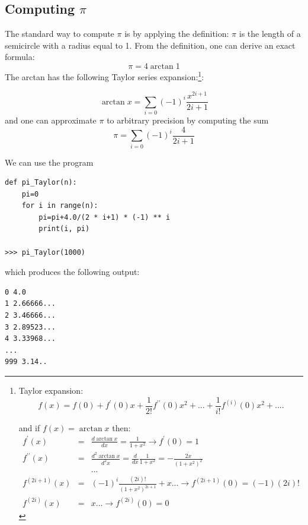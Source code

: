 \documentclass[justified, sixbynine]{tufte-book}
\theoremstyle{plain}%
\newtheorem * {corollary}{Corollary}
\theoremstyle{definition}
\theoremstyle{remark}
\newtheorem * {remark}{Remark}
\newtheorem * {note}{Note}
\begin{document}
\begin{fullwidth}
\goodbreak\subsection{Computing $\pi$}

The standard way to compute $\pi $ is by applying the definition: $\pi $ is
the length of a semicircle with a radius equal to 1. From the definition, one can
derive an exact formula:
\begin{equation}
\pi =4\arctan 1
\end{equation}
The arctan has the following Taylor series expansion:\footnote{%
Taylor expansion:
\begin{equation}
f(x)=f(0)+f^{\prime }(0)x+\frac 1{2!}f^{\prime \prime }(0)x^2+...+\frac
1{i!}f^{(i)}(0)x^2+....
\end{equation}
\par
and if $f(x)=\arctan x$ then:
\begin{eqnarray}
f^{\prime }(x) &=&\frac{d\arctan x}{dx}=\frac 1{1+x^2}\rightarrow f^{\prime
}(0)=1 \\
f^{\prime \prime }(x) &=&\frac{d^2\arctan x}{d^2x}=\frac d{dx}\frac
1{1+x^2}=-\frac{2x}{(1+x^2)^2} \\
&&... \\
f^{(2i+1)}(x) &=&(-1)^i\frac{(2i)!}{(1+x^2)^{2i+1}}+x...\rightarrow
f^{(2i+1)}(0)=(-1)(2i)! \\
f^{(2i)}(x) &=&x...\rightarrow f^{(2i)}(0)=0
\end{eqnarray}
}:

\begin{equation}
\arctan x=\allowbreak \sum_{i=0}(-1)^i\frac{x^{2i+1}}{2i+1}
\end{equation}
and one can approximate $\pi $ to arbitrary precision by computing the sum
\begin{equation}
\pi =\allowbreak \sum_{i=0}(-1)^i\frac 4{2i+1}
\end{equation}

We can use the program
\begin{lstlisting}
def pi_Taylor(n):
    pi=0
    for i in range(n):
        pi=pi+4.0/(2 * i+1) * (-1) ** i
        print(i, pi)

>>> pi_Taylor(1000)
\end{lstlisting}

which produces the following output:
\begin{lstlisting}
0 4.0
1 2.66666...
2 3.46666...
3 2.89523...
4 3.33968...
...
999 3.14..
\end{lstlisting}


\end{fullwidth}
\end{document}
